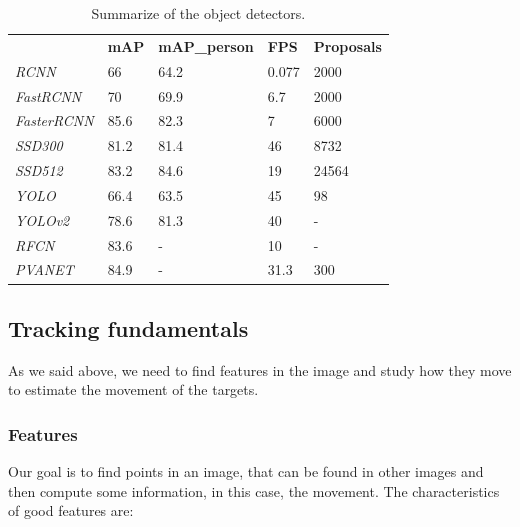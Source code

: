 \documentclass[12pt, a4paper, titlepage,twoside,openright]{article}
\begin{document}
\begin{table}[H]
\centering

\begin{tabular}{lllll}
                    & \textbf{mAP} & \textbf{mAP\_person} & \textbf{FPS} & \textbf{Proposals} \\
\textit{RCNN}       & 66           & 64.2                 & 0.077        & 2000               \\
\textit{FastRCNN}   & 70           & 69.9                 & 6.7          & 2000               \\
\textit{FasterRCNN} & 85.6         & 82.3                 & 7            & 6000               \\
\textit{SSD300}     & 81.2         & 81.4                 & 46           & 8732               \\
\textit{SSD512}     & 83.2         & 84.6                 & 19           & 24564              \\
\textit{YOLO}       & 66.4         & 63.5                 & 45           & 98                 \\
\textit{YOLOv2}     & 78.6         & 81.3                 & 40           & -                  \\
\textit{RFCN}       & 83.6         & -                    & 10           & -                  \\
\textit{PVANET}     & 84.9         & -                    & 31.3         & 300               
\end{tabular}

\caption{Summarize of the object detectors.}
\label{tableDet}
\end{table}







\subsection{Tracking fundamentals}\label{trackingIssues}

As we said above, we need to find features in the image and study how they move to estimate the movement of the targets.

\subsubsection{Features}\label{feature}

Our goal is to find points in an image, that can be found in other images and then compute some information, in this case, the movement. The characteristics of good features are:
\end{document}

